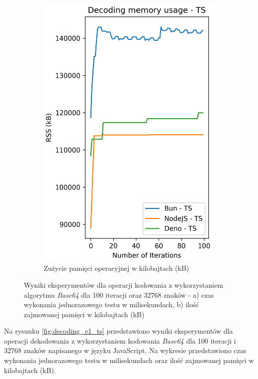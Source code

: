 \begin{figure}[H]
\begin{subfigure}[b]{0.4\textwidth}
    \includegraphics[width=\textwidth]{Figures/coding/base64_100_decoding_ts_memory.png}
    \caption{Zużycie pamięci operacyjnej w kilobajtach (kB)}
    \label{fig:encoding_e1_ts_memory}
  \end{subfigure}
  \hfill
  \caption{Wyniki eksperymentów dla operacji kodowania z wykorzystaniem algorytmu \textit{Base64} dla 100 iteracji oraz 32768 znaków - a) czas wykonania jednorazowego testu w milisekundach, b) ilość zajmowanej pamięci w kilobajtach (kB)}
  \label{fig:encoding_e1_ts}
\end{figure}

Na rysunku \ref{fig:decoding_e1_ts} przedstawiono wyniki eksperymentów dla operacji dekodowania z wykorzystaniem kodowania \textit{Base64} dla 100 iteracji i 32768 znaków napisanego w języku JavaScript. Na wykresie przedstawiono czas wykonania jednorazowego testu w milisekundach oraz ilość zajmowanej pamięci w kilobajtach (kB).

